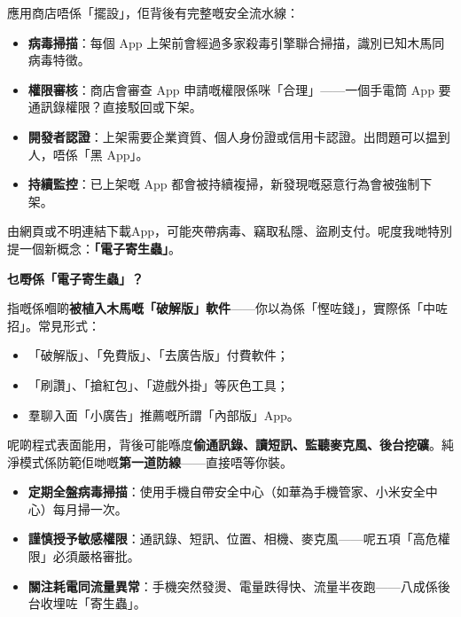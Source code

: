 
應用商店唔係「擺設」，佢背後有完整嘅安全流水線：

\begin{itemize}
  \item \textbf{病毒掃描}：每個 App 上架前會經過多家殺毒引擎聯合掃描，識別已知木馬同病毒特徵。
  \item \textbf{權限審核}：商店會審查 App 申請嘅權限係咪「合理」——一個手電筒 App 要通訊錄權限？直接駁回或下架。
  \item \textbf{開發者認證}：上架需要企業資質、個人身份證或信用卡認證。出問題可以揾到人，唔係「黑 App」。
  \item \textbf{持續監控}：已上架嘅 App 都會被持續複掃，新發現嘅惡意行為會被強制下架。
\end{itemize}


由網頁或不明連結下載App，可能夾帶病毒、竊取私隱、盜刷支付。呢度我哋特別提一個新概念：\textbf{「電子寄生蟲」}。

\textbf{乜嘢係「電子寄生蟲」？}\par

指嘅係嗰啲\textbf{被植入木馬嘅「破解版」軟件}——你以為係「慳咗錢」，實際係「中咗招」。常見形式：

\begin{itemize}
  \item 「破解版」、「免費版」、「去廣告版」付費軟件；
  \item 「刷讚」、「搶紅包」、「遊戲外掛」等灰色工具；
  \item 羣聊入面「小廣告」推薦嘅所謂「內部版」App。
\end{itemize}

呢啲程式表面能用，背後可能喺度\textbf{偷通訊錄、讀短訊、監聽麥克風、後台挖礦}。純淨模式係防範佢哋嘅\textbf{第一道防線}——直接唔等你裝。


\begin{itemize}
  \item \textbf{定期全盤病毒掃描}：使用手機自帶安全中心（如華為手機管家、小米安全中心）每月掃一次。
  \item \textbf{謹慎授予敏感權限}：通訊錄、短訊、位置、相機、麥克風——呢五項「高危權限」必須嚴格審批。
  \item \textbf{關注耗電同流量異常}：手機突然發燙、電量跌得快、流量半夜跑——八成係後台收埋咗「寄生蟲」。
\end{itemize}

